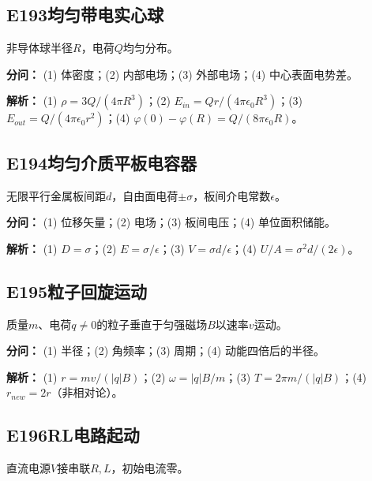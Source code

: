 \medskip

\subsection*{E193\quad 均匀带电实心球}

非导体球半径$R$，电荷$Q$均匀分布。

\par\textbf{分问：} (1) 体密度；(2) 内部电场；(3) 外部电场；(4) 中心表面电势差。

\par\textbf{解析：} (1) $\rho=3Q/(4\pi R^3)$；(2) $E_{in}=Qr/(4\pi\epsilon_0R^3)$；(3) $E_{out}=Q/(4\pi\epsilon_0r^2)$；(4) $\varphi(0)-\varphi(R)=Q/(8\pi\epsilon_0R)$。

\medskip

\subsection*{E194\quad 均匀介质平板电容器}

无限平行金属板间距$d$，自由面电荷$\pm\sigma$，板间介电常数$\epsilon$。

\par\textbf{分问：} (1) 位移矢量；(2) 电场；(3) 板间电压；(4) 单位面积储能。

\par\textbf{解析：} (1) $D=\sigma$；(2) $E=\sigma/\epsilon$；(3) $V=\sigma d/\epsilon$；(4) $U/A=\sigma^2d/(2\epsilon)$。

\medskip

\subsection*{E195\quad 粒子回旋运动}

质量$m$、电荷$q\ne0$的粒子垂直于匀强磁场$B$以速率$v$运动。

\par\textbf{分问：} (1) 半径；(2) 角频率；(3) 周期；(4) 动能四倍后的半径。

\par\textbf{解析：} (1) $r=mv/(|q|B)$；(2) $\omega=|q|B/m$；(3) $T=2\pi m/(|q|B)$；(4) $r_{new}=2r$（非相对论）。

\medskip

\subsection*{E196\quad RL电路起动}

直流电源$V$接串联$R,L$，初始电流零。

